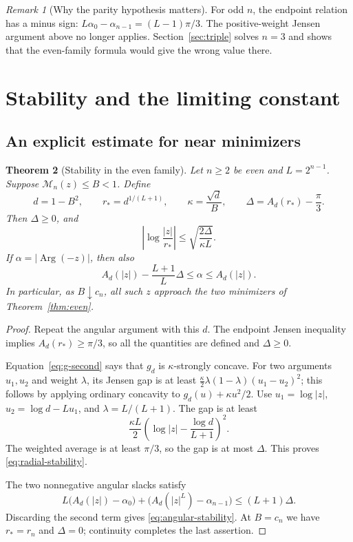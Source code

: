 \documentclass[11pt,a4paper]{article}
\newtheorem{theorem}{Theorem}[section]
\theoremstyle{definition}\newtheorem{definition}[theorem]{Definition}
\theoremstyle{remark}\newtheorem{remark}[theorem]{Remark}
\newcommand{\M}{\mathcal M}
\begin{document}
\begin{remark}[Why the parity hypothesis matters]
For odd $n$, the endpoint relation has a minus sign:
$L\alpha_0-\alpha_{n-1}=(L-1)\pi/3$.
The positive-weight Jensen argument above no longer applies. Section~\ref{sec:triple} solves $n=3$ and shows that the even-family formula would give the wrong value there.
\end{remark}

\section{Stability and the limiting constant}
\subsection{An explicit estimate for near minimizers}
\begin{theorem}[Stability in the even family]\label{thm:even-stability}
Let $n\ge2$ be even and $L=2^{n-1}$. Suppose $\M_n(z)\le B<1$. Define
\[
d=1-B^2,\qquad r_*=d^{1/(L+1)},\qquad
\kappa=\frac{\sqrt d}{B},\qquad
\Delta=A_d(r_*)-\frac\pi3.
\]
Then $\Delta\ge0$, and
\begin{equation}\label{eq:radial-stability}
\boxed{\ \left|\log\frac{|z|}{r_*}\right|
\le\sqrt{\frac{2\Delta}{\kappa L}}.\ }
\end{equation}
If $\alpha=|\operatorname{Arg}(-z)|$, then also
\begin{equation}\label{eq:angular-stability}
A_d(|z|)-\frac{L+1}{L}\Delta\le\alpha\le A_d(|z|).
\end{equation}
In particular, as $B\downarrow c_n$, all such $z$ approach the two minimizers of Theorem~\ref{thm:even}.
\end{theorem}
\begin{proof}
Repeat the angular argument with this $d$. The endpoint Jensen inequality implies $A_d(r_*)\ge\pi/3$, so all the quantities are defined and $\Delta\ge0$.

Equation~\eqref{eq:g-second} says that $g_d$ is $\kappa$-strongly concave. For two arguments $u_1,u_2$ and weight $\lambda$, its Jensen gap is at least
$\frac\kappa2\lambda(1-\lambda)(u_1-u_2)^2$; this follows by applying ordinary concavity to $g_d(u)+\kappa u^2/2$.
Use $u_1=\log|z|$, $u_2=\log d-Lu_1$, and $\lambda=L/(L+1)$. The gap is at least
\[
\frac{\kappa L}{2}\left(\log|z|-\frac{\log d}{L+1}\right)^2.
\]
The weighted average is at least $\pi/3$, so the gap is at most $\Delta$. This proves \eqref{eq:radial-stability}.

The two nonnegative angular slacks satisfy
\[
L\bigl(A_d(|z|)-\alpha_0\bigr)
+\bigl(A_d(|z|^L)-\alpha_{n-1}\bigr)\le(L+1)\Delta.
\]
Discarding the second term gives \eqref{eq:angular-stability}. At $B=c_n$ we have $r_*=r_n$ and $\Delta=0$; continuity completes the last assertion.
\end{proof}
\end{document}
